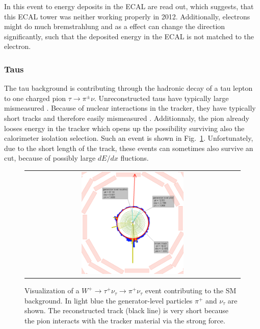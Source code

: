 In this event to energy deposits in the ECAL are read out, which suggests, that this ECAL tower was neither working properly in 2012.
Additionally, electrons might do much bremstrahlung and as a effect can change the direction significantly, such that the deposited energy in the ECAL is not matched to the electron.

\subsubsection*{Taus}
The tau background is contributing through the hadronic decay of a tau lepton to one charged pion $\tau\rightarrow\pi^{\pm}\nu$.
Unreconstructed taus have typically large mismeasured \pt.
Because of nuclear interactions in the tracker, they have typically short tracks and therefore easily mismeasured \pt.
Additionnaly, the pion already looses energy in the tracker which opens up the possibility surviving also the calorimeter isolation selection.
Such an event is shown in Fig.~\ref{fig:LostTau}.
Unfortunately, due to the short length of the track, these events can sometimes also survive an \ias cut, because of possibly large $dE/dx$ fluctions.
\begin{figure}[!tb]
  \centering 
  \begin{tabular}{c}
    \includegraphics[width=0.49\textwidth]{figures/analysis/LostTau_Lumi_60133_Event_24033837.png}
  \end{tabular}
  \caption{Visualization of a $W^{+}\rightarrow \tau^{+}\nu_{\tau} \rightarrow \pi^{+} \nu_{\tau}$ event contributing to the SM background. 
           In light blue the generator-level particles $\pi^{+}$ and $\nu_{\tau}$ are shown.
           The reconstructed track (black line) is very short because the pion interacts with the tracker material via the strong force.}
  \label{fig:LostTau}
\end{figure}

